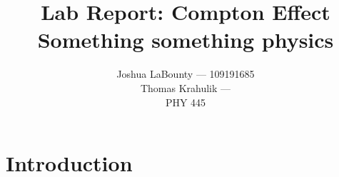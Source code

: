 \documentclass[12pt]{article}
\title{\textbf{Lab Report: Compton Effect} \\ Something something physics}
\author{Joshua LaBounty --- 109191685 \\ Thomas Krahulik ---  \\ PHY 445}
\begin{document}
\maketitle

\pagebreak

\tableofcontents 

\pagebreak

\section{Introduction}
\end{document}

